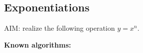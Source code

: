 \newpage
\subsection{Exponentiations}
\label{RSA_exponnentiation}

AIM: realize the following operation $ y = x ^ n $. 



\textbf{Known algorithms:}
\vspace{3mm}

	 	
		
			
									
		
		
			
		
		